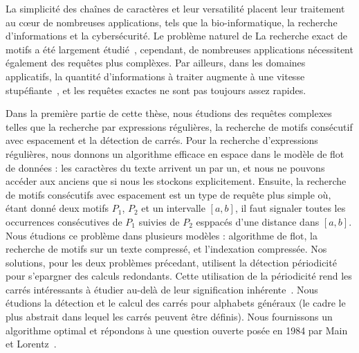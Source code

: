 La simplicité des chaînes de caractères et leur versatilité placent leur traitement au cœur de nombreuses applications, tels que la bio-informatique, la recherche d'informations et la cybersécurité. 
 Le problème naturel de La recherche exact de motifs a été largement étudié~\cite{charras2004handbook}, cependant, de nombreuses applications nécessitent également des requêtes plus complèxes. Par ailleurs, dans les domaines applicatifs, la quantité d'informations à traiter augmente à une vitesse stupéfiante~\cite{muir2016real}, et les requêtes exactes ne sont pas toujours assez rapides.

Dans la première partie de cette thèse, nous étudions des requêtes complexes telles que la recherche par expressions régulières, la recherche de motifs consécutif  avec espacement et la détection de carrés.
Pour la recherche d'expressions régulières, nous donnons un algorithme efficace en espace dans le modèle de flot de données : les caractères du texte arrivent un par un, et nous ne pouvons accéder aux anciens que si nous les stockons explicitement.
Ensuite, la recherche de motifs consécutifs avec espacement est un type de requête plus simple où, étant donné deux motifs $P_1$, $P_2$ et un intervalle $[a, b]$, il faut signaler toutes les occurrences consécutives de $P_1$ suivies de $P_2$ esppacés  d'une distance dans $[a, b]$. Nous étudions ce problème dans plusieurs modèles : algorithme de flot, la recherche de motifs sur un texte compressé, et l'indexation compressée.
Nos solutions, pour les deux problèmes précedant, utilisent la détection périodicité pour s'epargner des calculs redondants. Cette utilisation de la périodicité rend les carrés intéressants à étudier au-delà de leur signification inhérente~\cite{Kolpakov2003}. Nous étudions la détection et le calcul des carrés pour alphabets généraux (le cadre le plus abstrait dans lequel les carrés peuvent être définis). Nous fournissons un algorithme optimal et répondons à une question ouverte posée en 1984 par Main et Lorentz~\cite{Main1984}.

